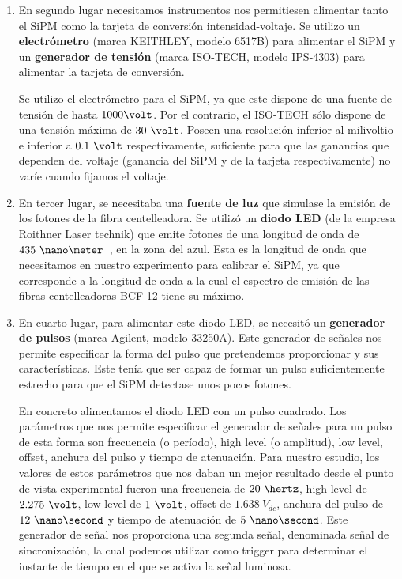 \begin{enumerate}
\item {} En segundo lugar necesitamos instrumentos nos permitiesen alimentar tanto el SiPM como la tarjeta de conversión intensidad-voltaje. Se utilizo  un \textbf{electrómetro} (marca KEITHLEY, modelo 6517B) para alimentar el SiPM y un \textbf{generador de tensión} (marca ISO-TECH, modelo IPS-4303) para alimentar la tarjeta de conversión.

Se utilizo el electrómetro para el SiPM, ya que este dispone de una fuente de tensión de hasta $1000\volt$. Por el contrario, el ISO-TECH sólo dispone de una tensión máxima de $30~\volt$. Poseen una resolución  inferior al milivoltio e inferior a $0.1~\volt$ respectivamente, suficiente para que las ganancias que dependen del voltaje (ganancia del SiPM y de la tarjeta respectivamente) no varíe cuando fijamos el voltaje.

\item {} En tercer lugar, se necesitaba una \textbf{fuente de luz} que simulase la emisión de los fotones de la fibra centelleadora. 
\newline
Se utilizó un \textbf{diodo LED} (de la empresa Roithner Laser technik) que emite fotones de una longitud de onda de $435~\nano\meter$~\cite{datasheetLED}, en la zona del azul. Esta es la longitud de onda que necesitamos en nuestro experimento para calibrar el SiPM, ya que corresponde a la longitud de onda a la cual el espectro de emisión de las fibras centelleadoras BCF-12 tiene su máximo.

\item {} En cuarto lugar, para alimentar este diodo LED, se necesitó un \textbf{generador de pulsos} (marca Agilent, modelo 33250A). Este generador de señales nos permite especificar la forma del pulso que pretendemos proporcionar y sus características. Este tenía que ser capaz de formar un pulso suficientemente estrecho para que el SiPM detectase unos pocos fotones. 

En concreto alimentamos el diodo LED con un pulso cuadrado. Los parámetros que nos permite especificar el generador de señales para un pulso de esta forma son frecuencia (o período), high level (o amplitud), low level, offset, anchura del pulso y tiempo de atenuación. Para nuestro estudio, los valores de estos parámetros que nos daban un mejor resultado desde el punto de vista experimental fueron una frecuencia de $20~\hertz$, high level de $2.275~\volt$, low level de $1~\volt$, offset de $1.638~V_{dc}$, anchura del pulso de $12~\nano\second$ y tiempo de atenuación de $5~\nano\second$.
Este generador de señal nos proporciona una segunda señal, denominada señal de sincronización, la cual podemos utilizar como trigger para determinar el instante de tiempo en el que se activa la señal luminosa.


\end{enumerate}
